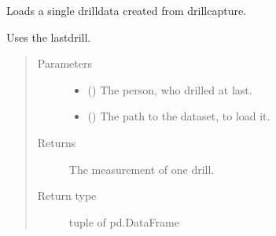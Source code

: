 \documentclass[letterpaper,10pt,english]{sphinxmanual}
\begin{document}
\begin{fulllineitems}
\label{\detokenize{anoog.io:anoog.io.csv_io.load_single_data}}
\sphinxAtStartPar
Loads a single drill\sphinxhyphen{}data created from drillcapture.

\sphinxAtStartPar
Uses the last\sphinxhyphen{}drill.
\begin{quote}\begin{description}
\item[{Parameters}] \leavevmode\begin{itemize}
\item {} 
\sphinxAtStartPar
{} () \textendash{} The person, who drilled at last.

\item {} 
\sphinxAtStartPar
{} () \textendash{} The path to the dataset, to load it.

\end{itemize}

\item[{Returns}] \leavevmode
\sphinxAtStartPar
The measurement of one drill.

\item[{Return type}] \leavevmode
\sphinxAtStartPar
tuple of pd.DataFrame

\end{description}\end{quote}

\end{fulllineitems}

\end{document}
